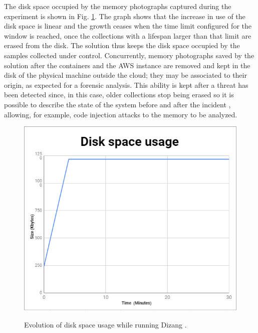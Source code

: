 \documentclass[conference]{IEEEtran}
\newcommand{\fancyname}{Dizang }
\begin{document}
The disk space occupied by the memory photographs captured during the experiment is shown in Fig. \ref{fig:evolucao_coleta}. 
%
The graph shows that the increase in use of the disk space is linear and the growth ceases when the time limit configured for the window is reached, once the collections with a lifespan larger than that limit are erased from the disk. 
%
The solution thus keeps the disk space occupied by the samples collected under control.
%
Concurrently, memory photographs saved by the solution after the containers and the AWS instance are removed and kept in the disk of the physical machine outside the cloud; they may be associated to their origin, as expected for a forensic analysis. 
%
This ability is kept after a threat has been detected since, in this case, older collections stop being erased so it is possible to describe the state of the system before and after the incident \cite{Case_Memory_Forensics:2014}, allowing, for example, code injection attacks to the memory to be analyzed.


\begin{figure}[htb!]
\footnotesize
\caption{Evolution of disk space usage while running \fancyname.}
\includegraphics[scale=0.55]{evolucao_coleta_ieee.png}
\centering
\label{fig:evolucao_coleta}
\end{figure}
\end{document}
